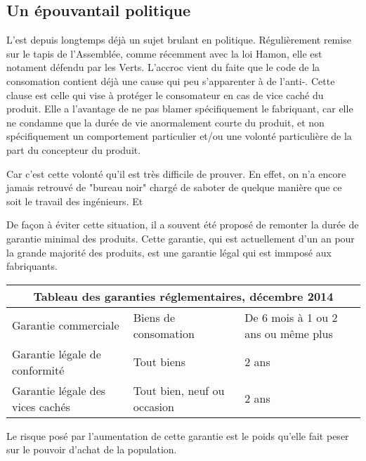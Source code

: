 \subsection{Un épouvantail politique}
L'\op est depuis longtemps déjà un sujet brulant en politique. Régulièrement remise sur le tapis de l'Assemblée, comme récemment avec la loi Hamon, elle est notament défendu par les Verts.
\smallbreak L'accroc vient du faite que le code de la consomation contient déjà une cause qui peu s'apparenter à de l'anti-\op.
Cette clause est celle qui vise à protéger le consomateur en cas de vice caché du produit. Elle a l'avantage de ne pas blamer spécifiquement le fabriquant, car elle ne condamne que la durée de vie anormalement courte du produit, et non spécifiquement un comportement particulier et/ou une volonté particulière de la part du concepteur du produit.

\smallbreak Car c'est cette volonté qu'il est très difficile de prouver. En effet, on n'a encore jamais retrouvé de "bureau noir" chargé de saboter de quelque manière que ce soit le travail des ingénieurs. Et

\smallbreak De façon à éviter cette situation, il a souvent été proposé de remonter la durée de garantie minimal des produits. Cette garantie, qui est actuellement d'un an pour la grande majorité des produits, est une garantie légal qui est immposé aux fabriquants.

\begin{center}
\begin{tabular}{|l|l|l|}
  \hline
  \multicolumn{3}{|c|}{Tableau des garanties réglementaires, décembre 2014} \\
	\hline Garantie commerciale & Biens de consomation & De 6 mois à 1 ou 2 ans ou même plus\\
	       Garantie légale de conformité & Tout biens & 2 ans \\
	       Garantie légale des vices cachés & Tout bien, neuf ou occasion & 2 ans \\
	\hline
\end{tabular}
\end{center}


\smallbreak Le risque posé par l'aumentation de cette garantie est le poids qu'elle fait peser sur le pouvoir d'achat de la population.
